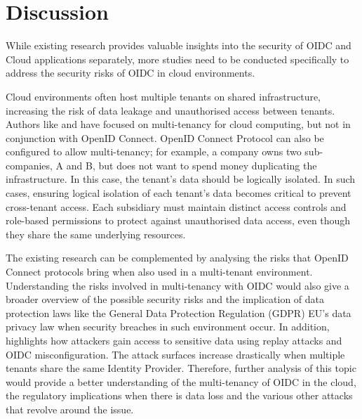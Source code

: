 \section{Discussion}

While existing research provides valuable insights into the security of OIDC and Cloud applications separately, more studies need to be conducted specifically to address the security risks of OIDC in cloud environments. 

Cloud environments often host multiple tenants on shared infrastructure, increasing the risk of data leakage and unauthorised access between tenants.
Authors like \cite{multi_tenancy_cloud_risk} and \cite{cloud_shared_resp} have focused on multi-tenancy for cloud computing, but not in conjunction with OpenID Connect.
OpenID Connect Protocol can also be configured to allow multi-tenancy; for example, a company owns two sub-companies, A and B, but does not want to spend money duplicating the infrastructure.
In this case, the tenant's data should be logically isolated.
In such cases, ensuring logical isolation of each tenant's data becomes critical to prevent cross-tenant access.
Each subsidiary must maintain distinct access controls and role-based permissions to protect against unauthorised data access, even though they share the same underlying resources. 

The existing research can be complemented by analysing the risks that OpenID Connect protocols bring when also used in a multi-tenant environment.
Understanding the risks involved in multi-tenancy with OIDC would also give a broader overview of the possible security risks and the implication of data protection laws like the General Data Protection Regulation (GDPR) EU's data privacy law \citep{gdpr} when security breaches in such environment occur.
In addition, \citep{oidc_attacks} highlights how attackers gain access to sensitive data using replay attacks and OIDC misconfiguration.
The attack surfaces increase drastically when multiple tenants share the same Identity Provider.
Therefore, further analysis of this topic would provide a better understanding of the multi-tenancy of OIDC in the cloud, the regulatory implications when there is data loss and the various other attacks that revolve around the issue.

